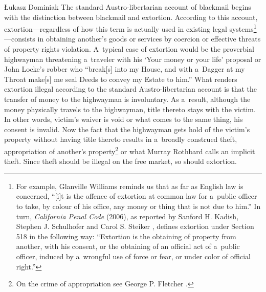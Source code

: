 \begin{artengenv}{Łukasz Dominiak}
The standard Austro-libertarian account of blackmail begins with the distinction between blackmail and extortion. According to this account, extortion---regardless of how this term is actually used in existing legal systems\footnote{For example, Glanville Williams 
\parencite*[][p.838]{williams_textbook_1983} %
 reminds us that as far as English law is concerned, ``[i]t is the offence of extortion at common law for a~public officer to take, by colour of his office, any money or thing that is not due to him.'' In turn, \textit{California Penal Code} (2006), as reported by Sanford H. Kadish, Stephen J. Schulhofer and Carol S. Steiker 
\parencite*[][p.941]{kadish_criminal_2007}, %
 defines extortion under Section 518 in the following way: ``Extortion is the obtaining of property from another, with his consent, or the obtaining of an official act of a~public officer, induced by a~wrongful use of force or fear, or under color of official right.''}---consists in obtaining another's goods or services by coercion or effective threats of property rights violation. A~typical case of extortion would be the proverbial highwayman threatening a~traveler with his ‘Your money or your life' proposal or John Locke's 
\parencite[p.~385\ \mbox{[1698, II, Chap.~XVI, §176]}]{locke_two_2003}\nocite{locke_two_1689} %
 robber who ``break[s] into my House, and with a~Dagger at my Throat make[s] me seal Deeds to convey my Estate to him.'' What renders extortion illegal according to the standard Austro-libertarian account is that the transfer of money to the highwayman is involuntary. As a~result, although the money physically travels to the highwayman, title thereto stays with the victim. In other words, victim's waiver is void or what comes to the same thing, his consent is invalid. Now the fact that the highwayman gets hold of the victim's property without having title thereto results in a~broadly construed theft, appropriation of another's property\footnote{On the crime of appropriation see George P. Fletcher 
\parencite*[][pp.7–22]{fletcher_rethinking_2000}.%
} or what Murray Rothbard 
\parencite*[][p.77]{rothbard_ethics_1998} %
 calls an implicit theft. Since theft should be illegal on the free market, so should extortion.




\end{artengenv}
